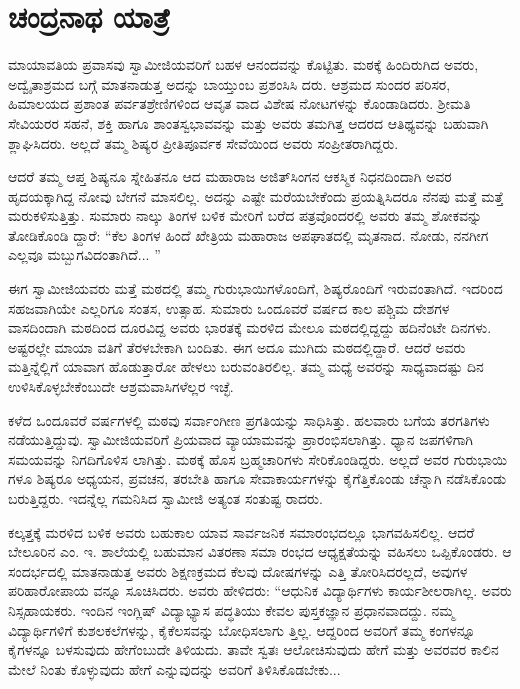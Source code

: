 
\chapter{ಚಂದ್ರನಾಥ ಯಾತ್ರೆ}

\noindent

ಮಾಯಾವತಿಯ ಪ್ರವಾಸವು ಸ್ವಾಮೀಜಿಯವರಿಗೆ ಬಹಳ ಆನಂದವನ್ನು ಕೊಟ್ಟಿತು. ಮಠಕ್ಕೆ ಹಿಂದಿರುಗಿದ ಅವರು, ಅದ್ವೈತಾಶ್ರಮದ ಬಗ್ಗೆ ಮಾತನಾಡುತ್ತ ಅದನ್ನು ಬಾಯ್ತುಂಬ ಪ್ರಶಂಸಿಸಿ ದರು. ಆಶ್ರಮದ ಸುಂದರ ಪರಿಸರ, ಹಿಮಾಲಯದ ಪ್ರಶಾಂತ ಪರ್ವತಶ್ರೇಣಿಗಳಿಂದ ಆವೃತ ವಾದ ವಿಶೇಷ ನೋಟಗಳನ್ನು ಕೊಂಡಾಡಿದರು. ಶ್ರೀಮತಿ ಸೇವಿಯರರ ಸಹನೆ, ಶಕ್ತಿ ಹಾಗೂ ಶಾಂತಸ್ವಭಾವವನ್ನು ಮತ್ತು ಅವರು ತಮಗಿತ್ತ ಆದರದ ಆತಿಥ್ಯವನ್ನು ಬಹುವಾಗಿ ಶ್ಲಾಘಿಸಿದರು. ಅಲ್ಲದೆ ತಮ್ಮ ಶಿಷ್ಯರ ಪ್ರೀತಿಪೂರ್ವಕ ಸೇವೆಯಿಂದ ಅವರು ಸಂಪ್ರೀತರಾಗಿದ್ದರು.

ಆದರೆ ತಮ್ಮ ಆಪ್ತ ಶಿಷ್ಯನೂ ಸ್ನೇಹಿತನೂ ಆದ ಮಹಾರಾಜ ಅಜಿತ್​ಸಿಂಗನ ಆಕಸ್ಮಿಕ ನಿಧನದಿಂದಾಗಿ ಅವರ ಹೃದಯಕ್ಕಾಗಿದ್ದ ನೋವು ಬೇಗನೆ ಮಾಸಲಿಲ್ಲ. ಅದನ್ನು ಎಷ್ಟೇ ಮರೆಯಬೇಕೆಂದು ಪ್ರಯತ್ನಿಸಿದರೂ ನೆನಪು ಮತ್ತೆ ಮತ್ತೆ ಮರುಕಳಿಸುತ್ತಿತ್ತು. ಸುಮಾರು ನಾಲ್ಕು ತಿಂಗಳ ಬಳಿಕ ಮೇರಿಗೆ ಬರೆದ ಪತ್ರವೊಂದರಲ್ಲಿ ಅವರು ತಮ್ಮ ಶೋಕವನ್ನು ತೋಡಿಕೊಂಡಿ ದ್ದಾರೆ: “ಕೆಲ ತಿಂಗಳ ಹಿಂದೆ ಖೇತ್ರಿಯ ಮಹಾರಾಜ ಅಪಘಾತದಲ್ಲಿ ಮೃತನಾದ. ನೋಡು, ನನಗೀಗ ಎಲ್ಲವೂ ಮಬ್ಬುಗವಿದಂತಾಗಿದೆ... ”

ಈಗ ಸ್ವಾಮೀಜಿಯವರು ಮತ್ತೆ ಮಠದಲ್ಲಿ ತಮ್ಮ ಗುರುಭಾಯಿಗಳೊಂದಿಗೆ, ಶಿಷ್ಯರೊಂದಿಗೆ ಇರುವಂತಾಗಿದೆ. ಇದರಿಂದ ಸಹಜವಾಗಿಯೇ ಎಲ್ಲರಿಗೂ ಸಂತಸ, ಉತ್ಸಾಹ. ಸುಮಾರು ಒಂದೂವರೆ ವರ್ಷದ ಕಾಲ ಪಶ್ಚಿಮ ದೇಶಗಳ ವಾಸದಿಂದಾಗಿ ಮಠದಿಂದ ದೂರವಿದ್ದ ಅವರು ಭಾರತಕ್ಕೆ ಮರಳಿದ ಮೇಲೂ ಮಠದಲ್ಲಿದ್ದದ್ದು ಹದಿನೆಂಟೇ ದಿನಗಳು. ಅಷ್ಟರಲ್ಲೇ ಮಾಯಾ ವತಿಗೆ ತೆರಳಬೇಕಾಗಿ ಬಂದಿತು. ಈಗ ಅದೂ ಮುಗಿದು ಮಠದಲ್ಲಿದ್ದಾರೆ. ಆದರೆ ಅವರು ಮತ್ತಿನ್ನೆಲ್ಲಿಗೆ ಯಾವಾಗ ಹೊಡುತ್ತಾರೋ ಹೇಳಲು ಬರುವಂತಿರಲಿಲ್ಲ. ತಮ್ಮ ಮಧ್ಯೆ ಅವರನ್ನು ಸಾಧ್ಯವಾದಷ್ಟು ದಿನ ಉಳಿಸಿಕೊಳ್ಳಬೇಕೆಂಬುದೇ ಆಶ್ರಮವಾಸಿಗಳೆಲ್ಲರ ಇಚ್ಛೆ.

ಕಳೆದ ಒಂದೂವರೆ ವರ್ಷಗಳಲ್ಲಿ ಮಠವು ಸರ್ವಾಂಗೀಣ ಪ್ರಗತಿಯನ್ನು ಸಾಧಿಸಿತ್ತು. ಹಲವಾರು ಬಗೆಯ ತರಗತಿಗಳು ನಡೆಯುತ್ತಿದ್ದುವು. ಸ್ವಾಮೀಜಿಯವರಿಗೆ ಪ್ರಿಯವಾದ ವ್ಯಾಯಾಮವನ್ನು ಪ್ರಾರಂಭಿಸಲಾಗಿತ್ತು. ಧ್ಯಾನ ಜಪಗಳಿಗಾಗಿ ಸಮಯವನ್ನು ನಿಗದಿಗೊಳಿಸ ಲಾಗಿತ್ತು. ಮಠಕ್ಕೆ ಹೊಸ ಬ್ರಹ್ಮಚಾರಿಗಳು ಸೇರಿಕೊಂಡಿದ್ದರು. ಅಲ್ಲದೆ ಅವರ ಗುರುಭಾಯಿ ಗಳೂ ಶಿಷ್ಯರೂ ಅಧ್ಯಯನ, ಪ್ರವಚನ, ತರಬೇತಿ ಹಾಗೂ ಸೇವಾಕಾರ್ಯಗಳನ್ನು ಕೈಗೆತ್ತಿಕೊಂಡು ಚೆನ್ನಾಗಿ ನಡೆಸಿಕೊಂಡು ಬರುತ್ತಿದ್ದರು. ಇದನ್ನೆಲ್ಲ ಗಮನಿಸಿದ ಸ್ವಾಮೀಜಿ ಅತ್ಯಂತ ಸಂತುಷ್ಟ ರಾದರು.

ಕಲ್ಕತ್ತಕ್ಕೆ ಮರಳಿದ ಬಳಿಕ ಅವರು ಬಹುಕಾಲ ಯಾವ ಸಾರ್ವಜನಿಕ ಸಮಾರಂಭದಲ್ಲೂ ಭಾಗವಹಿಸಲಿಲ್ಲ. ಆದರೆ ಬೇಲೂರಿನ ಎಂ. ಇ. ಶಾಲೆಯಲ್ಲಿ ಬಹುಮಾನ ವಿತರಣಾ ಸಮಾ ರಂಭದ ಆಧ್ಯಕ್ಷತೆಯನ್ನು ವಹಿಸಲು ಒಪ್ಪಿಕೊಂಡರು. ಆ ಸಂದರ್ಭದಲ್ಲಿ ಮಾತನಾಡುತ್ತ ಅವರು ಶಿಕ್ಷಣಕ್ರಮದ ಕೆಲವು ದೋಷಗಳನ್ನು ಎತ್ತಿ ತೋರಿಸಿದರಲ್ಲದೆ, ಅವುಗಳ ಪರಿಹಾರೋಪಾಯ ವನ್ನೂ ಸೂಚಿಸಿದರು. ಅವರು ಹೇಳಿದರು: “ಆಧುನಿಕ ವಿದ್ಯಾರ್ಥಿಗಳು ಕಾರ್ಯಶೀಲರಾಗಿಲ್ಲ. ಅವರು ನಿಸ್ಸಹಾಯಕರು. ಇಂದಿನ ಇಂಗ್ಲಿಷ್ ವಿದ್ಯಾಭ್ಯಾಸ ಪದ್ಧತಿಯು ಕೇವಲ ಪುಸ್ತಕಜ್ಞಾನ ಪ್ರಧಾನವಾದದ್ದು. ನಮ್ಮ ವಿದ್ಯಾರ್ಥಿಗಳಿಗೆ ಕುಶಲಕಲೆಗಳನ್ನು, ಕೈಕೆಲಸವನ್ನು ಬೋಧಿಸಲಾಗು ತ್ತಿಲ್ಲ. ಆದ್ದರಿಂದ ಅವರಿಗೆ ತಮ್ಮ ಕಂಗಳನ್ನೂ ಕೈಗಳನ್ನೂ ಬಳಸುವುದು ಹೇಗೆಂಬುದೇ ತಿಳಿಯದು. ತಾವೇ ಸ್ವತಃ ಆಲೋಚಿಸುವುದು ಹೇಗೆ ಮತ್ತು ಅವರವರ ಕಾಲಿನ ಮೇಲೆ ನಿಂತು ಕೊಳ್ಳುವುದು ಹೇಗೆ ಎನ್ನುವುದನ್ನು ಅವರಿಗೆ ತಿಳಿಸಿಕೊಡಬೇಕು... 

